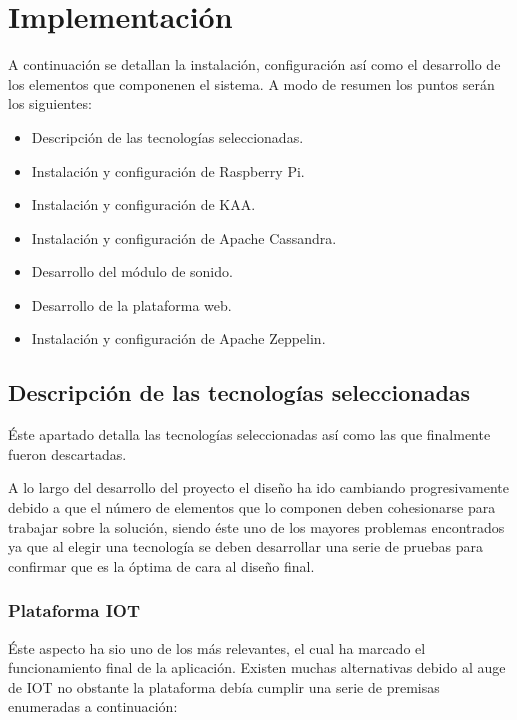 \chapter{Implementación}

A continuación se detallan la instalación, configuración así como el desarrollo de los elementos que componenen el sistema. A modo de resumen los puntos serán los siguientes:

\begin{itemize}
	\item Descripción de las tecnologías seleccionadas.
	\item Instalación y configuración de Raspberry Pi.
	\item Instalación y configuración de KAA.
	\item Instalación y configuración de Apache Cassandra.
	\item Desarrollo del módulo de sonido.
	\item Desarrollo de la plataforma web.
	\item Instalación y configuración de Apache Zeppelin.
\end{itemize}

\newpage

\section{ Descripción de las tecnologías seleccionadas}

Éste apartado detalla las tecnologías seleccionadas así como las que finalmente fueron descartadas.

A lo largo del desarrollo del proyecto el diseño ha ido cambiando progresivamente debido a que el número de elementos que lo componen deben cohesionarse para trabajar sobre la solución, siendo éste uno de los mayores problemas encontrados ya que al elegir una tecnología se deben desarrollar una serie de pruebas para confirmar que es la óptima de cara al diseño final.

\newpage

\subsection{Plataforma IOT}

Éste aspecto ha sio uno de los más relevantes, el cual ha marcado el funcionamiento final de la aplicación. Existen muchas alternativas debido al auge de IOT no obstante la plataforma debía cumplir una serie de premisas enumeradas a continuación:

